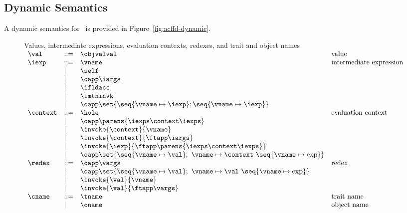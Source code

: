 %
%
%
%

\subsection{Dynamic Semantics}\label{acffd-dynamic}
A dynamic semantics for \acffdcore\ is provided in
Figure~\ref{fig:acffd-dynamic}.

\begin{figure}[htbp]
Values, intermediate expressions,
evaluation contexts, redexes, and trait and object names\\

$
\begin{array}{llll}
\val &::=& \objvalval&\mbox{value}\\
\iexp   &::=& \vname &\mbox{intermediate expression}\\
         &|& \self\\
         &|& \oapp\iargs\\
         &|& \ifldacc\\
         &|& \imthinvk\\
         &|& \oapp\set{\seq{\vname\mapsto\iexp}; \seq{\vname\mapsto\iexp}}\\
\context &::=& \hole&\mbox{evaluation context}\\
      &|& \oapp\parens{\iexps\context\iexps}\\
      &|& \invoke{\context}{\vname}\\
      &|& \invoke{\context}{\ftapp\iargs}\\
      &|& \invoke{\iexp}{\ftapp\parens{\iexps\context\iexps}}\\
      &|& \oapp\set{\seq{\vname\mapsto\val};\ \vname\mapsto\context\ \seq{\vname\mapsto\exp}}\\
\redex &::=& \oapp\vargs&\mbox{redex}\\
      &|& \oapp\set{\seq{\vname\mapsto\val};\ \vname\mapsto\val\ \seq{\vname\mapsto\exp}}\\
      &|& \invoke{\val}{\vname}\\
      &|& \invoke{\val}{\ftapp\vargs}\\
\cname &::=& \tname&\mbox{trait name}\\
      &|& \oname&\mbox{object name}\\ \\
\end{array}
$


\end{figure}
